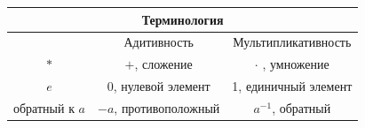 \documentclass[a4paper, 12pt]{article}
\theoremstyle{definition}
\begin{document}
  \vspace{5pt}
  \begin{center}
    \begin{tabular}{|c|c|c|}
      \hline \multicolumn{3}{|c|}{\textbf{Терминология} } \\ \hline
      \null & Адитивность & Мультипликативность \\ \hline
      $*$ & $+$, сложение & $\cdot$ , умножение \\ \hline
      $e$ & 0, нулевой элемент & 1, единичный элемент \\ \hline
      обратный к $a$ & $-a$, противоположный & $a^{-1}$, обратный \\ \hline
    \end{tabular}
  \end{center}
  \vspace{5pt}
\end{document}
